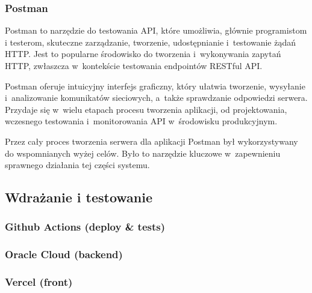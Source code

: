 \subsubsection{Postman}

Postman \cite{Postman} to narzędzie do testowania API, które umożliwia, głównie
programistom i testerom, skuteczne zarządzanie, tworzenie, udostępnianie
i~testowanie żądań HTTP. Jest to popularne środowisko do tworzenia
i~wykonywania zapytań HTTP, zwłaszcza w~kontekście testowania
endpointów RESTful API.

Postman oferuje intuicyjny interfejs graficzny, który ułatwia tworzenie,
wysyłanie i~analizowanie komunikatów sieciowych, a~także sprawdzanie
odpowiedzi serwera. Przydaje się w~wielu etapach procesu tworzenia
aplikacji, od projektowania, wczesnego testowania i~monitorowania API
w~środowisku produkcyjnym.

Przez cały proces tworzenia serwera dla aplikacji Postman był wykorzystywany
do wspomnianych wyżej celów. Było to narzędzie kluczowe w~zapewnieniu
sprawnego działania tej części systemu.


\subsection{Wdrażanie i testowanie}

\subsubsection{Github Actions (deploy \& tests)}


\subsubsection{Oracle Cloud (backend)}

\subsubsection{Vercel (front)}
